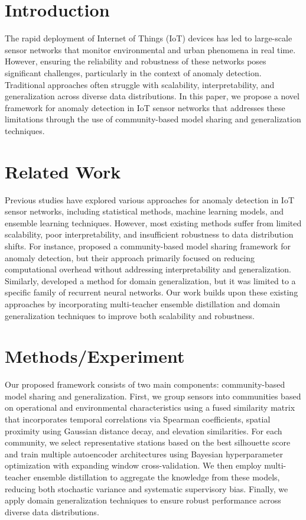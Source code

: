 \section{Introduction}
The rapid deployment of Internet of Things (IoT) devices has led to large-scale sensor networks that monitor environmental and urban phenomena in real time. However, ensuring the reliability and robustness of these networks poses significant challenges, particularly in the context of anomaly detection. Traditional approaches often struggle with scalability, interpretability, and generalization across diverse data distributions. In this paper, we propose a novel framework for anomaly detection in IoT sensor networks that addresses these limitations through the use of community-based model sharing and generalization techniques.

\section{Related Work}
Previous studies have explored various approaches for anomaly detection in IoT sensor networks, including statistical methods, machine learning models, and ensemble learning techniques. However, most existing methods suffer from limited scalability, poor interpretability, and insufficient robustness to data distribution shifts. For instance, \cite{hammad2026communitybasedmodelsharinggeneralisation} proposed a community-based model sharing framework for anomaly detection, but their approach primarily focused on reducing computational overhead without addressing interpretability and generalization. Similarly, \cite{termehchi2026generalizationanalysismethoddomain} developed a method for domain generalization, but it was limited to a specific family of recurrent neural networks. Our work builds upon these existing approaches by incorporating multi-teacher ensemble distillation and domain generalization techniques to improve both scalability and robustness.

\section{Methods/Experiment}
Our proposed framework consists of two main components: community-based model sharing and generalization. First, we group sensors into communities based on operational and environmental characteristics using a fused similarity matrix that incorporates temporal correlations via Spearman coefficients, spatial proximity using Gaussian distance decay, and elevation similarities. For each community, we select representative stations based on the best silhouette score and train multiple autoencoder architectures using Bayesian hyperparameter optimization with expanding window cross-validation. We then employ multi-teacher ensemble distillation to aggregate the knowledge from these models, reducing both stochastic variance and systematic supervisory bias. Finally, we apply domain generalization techniques to ensure robust performance across diverse data distributions.

